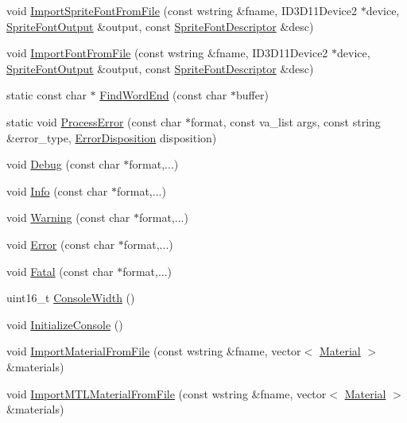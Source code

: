 \begin{DoxyCompactItemize}
\item 
void \hyperlink{namespacemage_aac88563417bcd178423aec61ca687a74}{Import\+Sprite\+Font\+From\+File} (const wstring \&fname, I\+D3\+D11\+Device2 $\ast$device, \hyperlink{structmage_1_1_sprite_font_output}{Sprite\+Font\+Output} \&output, const \hyperlink{structmage_1_1_sprite_font_descriptor}{Sprite\+Font\+Descriptor} \&desc)
\item 
void \hyperlink{namespacemage_a23fecd103cda79e7c9fd5cf372ae5e9f}{Import\+Font\+From\+File} (const wstring \&fname, I\+D3\+D11\+Device2 $\ast$device, \hyperlink{structmage_1_1_sprite_font_output}{Sprite\+Font\+Output} \&output, const \hyperlink{structmage_1_1_sprite_font_descriptor}{Sprite\+Font\+Descriptor} \&desc)
\item 
static const char $\ast$ \hyperlink{namespacemage_a81ebde51f9da00dd6fad364a2c5017cb}{Find\+Word\+End} (const char $\ast$buffer)
\item 
static void \hyperlink{namespacemage_ab248f74af47acacc1306e875fb19a9ce}{Process\+Error} (const char $\ast$format, const va\+\_\+list args, const string \&error\+\_\+type, \hyperlink{namespacemage_a7146b3c3db53179eeb32bf4d51934715}{Error\+Disposition} disposition)
\item 
void \hyperlink{namespacemage_a1bcf1f0301e170105908eee5b5c46830}{Debug} (const char $\ast$format,...)
\item 
void \hyperlink{namespacemage_add6aa5f13960ce07b20f48d273956a91}{Info} (const char $\ast$format,...)
\item 
void \hyperlink{namespacemage_a0eccd8065c75d5f2bf86b48a5be3bfe5}{Warning} (const char $\ast$format,...)
\item 
void \hyperlink{namespacemage_a52a7fe8c9ce39afd9e0b0299373db0fa}{Error} (const char $\ast$format,...)
\item 
void \hyperlink{namespacemage_aefd40c91591a8e0423e4222b4a5e6249}{Fatal} (const char $\ast$format,...)
\item 
uint16\+\_\+t \hyperlink{namespacemage_a2988e0e46e373691a189ea97135f1ed1}{Console\+Width} ()
\item 
void \hyperlink{namespacemage_a587146c8cbeed655be16ddff8435c05c}{Initialize\+Console} ()
\item 
void \hyperlink{namespacemage_a1ec5e042dc875b6f9ec5e2f15c7d6320}{Import\+Material\+From\+File} (const wstring \&fname, vector$<$ \hyperlink{structmage_1_1_material}{Material} $>$ \&materials)
\item 
void \hyperlink{namespacemage_af823dc7245aa79b1e789ac8f58d766d2}{Import\+M\+T\+L\+Material\+From\+File} (const wstring \&fname, vector$<$ \hyperlink{structmage_1_1_material}{Material} $>$ \&materials)

\end{DoxyCompactItemize}
